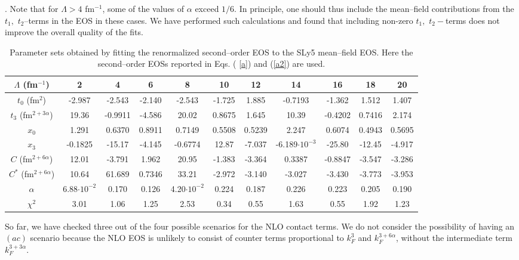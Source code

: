 \documentclass[aps,11pt,prc,preprint,superscriptaddress,nofootinbib]{revtex4}
\begin{document}
. Note that for $\Lambda > 4$ fm$^{-1}$, some of the values
of $\alpha$ exceed $1/6$. In principle, one should thus include the mean--field
contributions from the $t_{1},$ $t_{2}$--terms in the EOS in these cases. We
have performed such calculations and found that including non-zero $t_{1},$ $%
t_{2}-$terms does not improve the overall quality of the fits.
\begin{table}[tbp]
\begin{tabular}{|c|c|c|c|c|c|c|c|c|c|c|}
\hline
$\Lambda $ (fm$^{-1}$) & 2 & 4 & 6 & 8 & 10 & 12 & 14 & 16 & 18 & 20 \\ \hline
$t_{0}$ (fm$^{2}$) & -2.987 & -2.543 & -2.140 & -2.543 & -1.725 & 1.885 & -0.7193 & -1.362 & 1.512 & 1.407\\ 
\hline
$t_{3}$ (fm$^{2+3\alpha }$) & 19.36 & -0.9911 & -4.586 & 
20.02 & 0.8675 & 1.645 & 10.39 & -0.4202 & 0.7416 & 2.174\\ \hline
$x_{0}$ & 1.291 & 0.6370 & 0.8911 & 0.7149 & 0.5508 & 0.5239 & 2.247 & 0.6074 & 0.4943 & 0.5695 \\ \hline
$x_{3}$ & -0.1825 & -15.17 & -4.145 & -0.6774 & 12.87 & -7.037 & -6.189$\cdot 10^{-3}$ & -25.80 & -12.45 & -4.917\\ 
\hline
$C$ (fm$^{2+6\alpha }$) & 12.01 & -3.791 & 1.962 & 20.95 & -1.383 & -3.364 & 0.3387 & -0.8847 & -3.547 & -3.286
\\ \hline
$C^{\ast }$ (fm$^{2+6\alpha }$) & 10.64 & 61.689 & 0.7346 & 33.21 & -2.972 & 
-3.140 & -3.027 & -3.430 & -3.773 & -3.953\\ \hline
$\alpha $ & 6.88$\cdot 10^{-2}$ & 0.170 & 0.126 & 4.20$\cdot 10^{-2}$ & 
0.224 & 0.187 & 0.226 & 0.223 & 0.205 & 0.190\\ \hline
$\chi ^{2}$ & 3.01 & 1.06 & 1.25 & 2.53 & 0.34 & 0.55 & 1.63 & 0.55 & 1.92 & 1.23 \\ \hline
\end{tabular}%
\caption{Parameter sets obtained by fitting the renormalized second--order
EOS to the SLy5 mean--field EOS. Here the second--order EOSs reported in Eqs. (%
\protect\ref{a}) and (\protect\ref{a2}) are used.}
\label{tnloc}
\end{table}


So far, we have checked three out of the four possible scenarios for the NLO contact terms. We do not consider the possibility of having an $(ac)$ scenario because the NLO EOS is unlikely to consist of counter terms proportional to $k_F^3$ and $k_F^{3+6\alpha}$, without the intermediate term $k_F^{3+3\alpha}$.  
\end{document}
